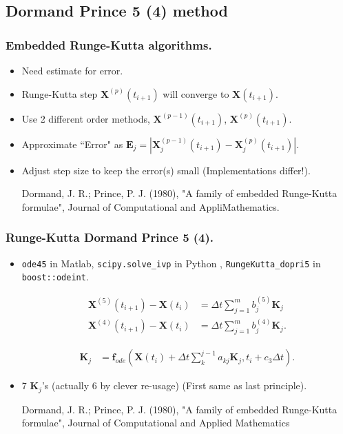 \documentclass{beamer}
\begin{document}
\subsection{Dormand Prince 5 (4) method}

\begin{frame}
\frametitle{Embedded Runge-Kutta algorithms.}
\begin{itemize}
\item <1-> Need estimate for error.

\item <2-> Runge-Kutta step $\mathbf{X}^{(p)}(t_{i+1})$ will converge to $\mathbf{X}(t_{i+1})$.
\item <3-> Use 2 different order methods, $\mathbf{X}^{(p-1)}(t_{i+1})$, $\mathbf{X}^{(p)}(t_{i+1})$.

\item <4-> Approximate ``Error" as  $\mathbf{E}_j = |\mathbf{X}^{(p-1)}_j(t_{i+1})-\mathbf{X}^{(p)}_j(t_{i+1})|$.

\item <5-> Adjust step size to keep the error(s) small (Implementations differ!).

{\color{gray} Dormand, J. R.; Prince, P. J. (1980), "A family of embedded Runge-Kutta formulae", Journal of Computational and AppliMathematics.}
\end{itemize}
\end{frame}


\begin{frame}
\frametitle{Runge-Kutta Dormand Prince 5 (4).}

\begin{itemize}
\item <1->\lstinline{ode45} in Matlab, \lstinline{scipy.solve_ivp} in Python , \lstinline{RungeKutta_dopri5} in \lstinline{boost::odeint}.

\begin{align*}
\mathbf{X}^{(5)}(t_{i+1})-\mathbf{X}(t_{i}) &=  \Delta t \sum_{j=1}^{m} b_j^{(5)} \mathbf{K}_j\\
\mathbf{X}^{(4)}(t_{i+1})-\mathbf{X}(t_{i}) &=  \Delta t \sum_{j=1}^{m} b_j^{(4)} \mathbf{K}_j.
\end{align*}

\begin{align*}
\mathbf{K}_j &= \mathbf{f}_{ode}(\mathbf{X}(t_i)+\Delta t \sum_k^{j-1} a_{kj} \mathbf{K}_j,t_i+c_3 \Delta t).
\end{align*}

\item <2-> 7 $\mathbf{K}_j$'s (actually 6 by clever re-usage) (First same as last principle).

{\color{gray} Dormand, J. R.; Prince, P. J. (1980), "A family of embedded Runge-Kutta formulae", Journal of Computational and Applied Mathematics}
\end{itemize}
\end{frame}
\end{document}
